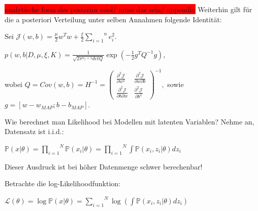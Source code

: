\documentclass{beamer}
\begin{document}
{\begin{frame}
\colorbox{red}{analytische form des posterior cool/ muss das sein/ appendix}
Weiterhin gilt für die a posteriori Verteilung unter selben Annahmen folgende Identität:

Sei $\mathcal{J}(w,b) = \frac{\mu}{2}w^T w + \frac{\xi}{2}\overset{n}{\underset{i=1}{\sum}} e_i ^2$.
\begin{center}


$p(w,b \vert D, \mu, \xi, K) = \frac{1}{\sqrt{2\pi^{n_f +1} det Q}} \exp(-\frac{1}{2} g^T Q^{-1} g)$,

\end{center}

wobei $Q = Cov(w,b) =  H^{-1} 
= 
\begin{pmatrix}
\frac{\partial^2 \mathcal{J}}{\partial w^2 } & \frac{\partial^2 \mathcal{J}}{\partial w \partial b } \\
\frac{\partial^2 \mathcal{J}}{\partial b \partial w } & \frac{\partial^2 \mathcal{J}}{\partial b^2 }
\end{pmatrix}^{-1},
$
sowie $g = [w - w_{MAP}; b - b_{MAP}]$.


\end{frame}



\begin{frame}

 
 
Wie berechnet man Likelihood bei Modellen mit latenten Variablen? Nehme an, Datensatz ist i.i.d.:

\begin{center}
$\mathbb{P}(x\vert \theta) = \overset{N}{\underset{i=1}{\prod}}\mathbb{P}(x_i\vert \theta) = \overset{N}{\underset{i=1}{\prod}}\int\mathbb{P}(x_i, z_i\vert \theta)dz_i $
\end{center}

Dieser Ausdruck ist bei höher Datenmenge schwer berechenbar!

\end{frame}

\begin{frame}

Betrachte die log-Likelihoodfunktion:

\begin{center}
$\mathcal{L}(\theta) = \log \mathbb{P}(x \vert \theta) = \overset{N}{\underset{i=1}{\sum}}\log(\int\mathbb{P}(x_i, z_i\vert \theta)dz_i)$
\end{center}


\end{frame}}
\end{document}
